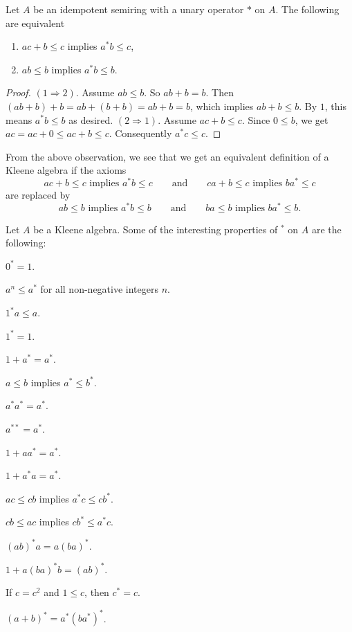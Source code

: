 \documentclass[12pt]{article}
\begin{document}
Let $A$ be an idempotent semiring with a unary operator $*$ on $A$.  The following are equivalent
\begin{enumerate}
\item $ac+b\le c$ implies $a^*b\le c$,
\item $ab\le b$ implies $a^*b\le b$.
\end{enumerate}
\begin{proof} $(1\Rightarrow 2)$.  Assume $ab\le b$.  So $ab+b=b$.  Then $(ab+b)+b=ab+(b+b)=ab+b=b$, which implies $ab+b\le b$.  By $1$, this means $a^*b\le b$ as desired.  $(2\Rightarrow 1)$.  Assume $ac+b\le c$.  Since $0\le b$, we get $ac=ac+0\le ac+b\le c$.  Consequently $a^*c \le c$.
\end{proof}

From the above observation, we see that we get an equivalent definition of a Kleene algebra if the axioms
$$ac+b\le c\mbox{ implies }a^*b\le c\qquad \mbox{and}\qquad ca+b\le c\mbox{ implies }ba^*\le c$$
are replaced by
$$ab\le b\mbox{ implies }a^*b\le b\qquad \mbox{and}\qquad ba\le b\mbox{ implies }ba^*\le b.$$

Let $A$ be a Kleene algebra.  Some of the interesting properties of $^*$ on $A$ are the following:
\begin{enumerate}
\begin{multicols}{2}{
\item $0^*=1$.\\[-3ex]
\item $a^n\le a^*$ for all non-negative integers $n$.\\[-3ex]
\item $1^*a\le a$.\\[-3ex]
\item $1^*=1$.\\[-3ex]
\item $1+a^*=a^*$.\\[-3ex]
\item $a\le b$ implies $a^*\le b^*$.\\[-3ex]
\item $a^*a^*=a^*$.\\[-3ex]
\item $a^{**}=a^*$.\\[-3ex]
\item $1+aa^*=a^*$.\\[-3ex]
\item $1+a^*a=a^*$.\\[-3ex]
\item $ac\le cb$ implies $a^*c\le cb^*$.\\[-3ex]
\item $cb\le ac$ implies $cb^*\le a^*c$.\\[-3ex]
\item $(ab)^*a=a(ba)^*$.\\[-3ex]
\item $1+a(ba)^*b=(ab)^*$.\\[-3ex]
\item If $c=c^2$ and $1\le c$, then $c^*=c$.\\[-3ex]
\item $(a+b)^*=a^*(ba^*)^*$.\\[-3ex]
}\end{multicols}
\end{enumerate}
\end{document}
